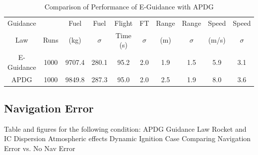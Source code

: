 \begin{table}[ht]                                                                                              
	\centering        
	\caption{Comparison of Performance of E-Guidance with APDG}                     
	\label{tab:EvsADPG}                                                                                              
	\begin{tabular}{|c|c|c|c|c|c|c|c|c|c|}                                                                         
		\hline                                                                                                        Guidance &      &   Fuel   &    Fuel   & Flight    &   FT     &  Range    &  Range   & Speed   &   Speed  \\ 
		Law      & Runs & (kg)      & $\sigma$ &  Time (s) & $\sigma$ &  (m) &    $  \sigma$ & (m/s)   & $\sigma$ \\
		
		\hline                                                                                                         
		E-Guidance  & 1000 & 9707.4 & 280.1 & 95.2 & 2.0 & 1.9 & 1.5 & 5.9 & 3.1 \\                                     
		\hline                                                                                                         
		APDG  & 1000 & 9849.8 & 287.3 & 95.0 & 2.0 & 2.5 & 1.9 & 8.0 & 3.6 \\                                       
		\hline                                                                                                         
	\end{tabular}                                                                                                  
	
\end{table}      

\subsection{Navigation Error} \label{sec:naverror}
Table and figures for the following condition:
APDG Guidance Law
Rocket and IC Dispersion
Atmospheric effects
Dynamic Ignition Case
Comparing Navigation Error vs. No Nav Error

